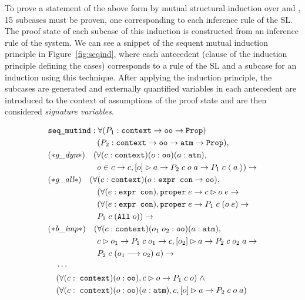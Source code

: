 To prove a statement of the above form by mutual structural induction over  and , 15 subcases must be proven, one corresponding to each inference rule of the SL. The proof state of each subcase of this induction is constructed from an inference rule of the system.
%
We can see a snippet of the sequent mutual induction principle in Figure~\ref{fig:seqind}, where each antecedent (clause of the induction principle defining the cases) corresponds to a rule of the SL and a subcase for an induction using this technique. 
After applying the induction principle, the subcases are generated and
externally quantified variables in each antecedent are introduced to the context of assumptions of the proof state and are then considered \emph{signature variables}.
\begin{figure}%
\begin{align*}
& \sltm{seq\_mutind} : \forall (P_1 : \sltm{context} \rightarrow \sltm{oo} \rightarrow \coqtm{Prop}) \\
& \qquad\qquad\qquad (P_2 : \sltm{context} \rightarrow \sltm{oo} \rightarrow \sltm{atm} \rightarrow \coqtm{Prop}), \\
& (* \rlnmsinit{} *) \quad (\forall (c : \sltm{context}) (o : \sltm{oo}) (a : \sltm{atm}), \\
& \qquad\qquad\qquad o \in c \rightarrow \bchsl[c]{o}{a} \rightarrow P_2 \; c \; o \; a \rightarrow P_1 \; c \; \atom{a}) \rightarrow \\
& (* \rlnmsall{} *) \quad (\forall (c : \sltm{context}) (o : \sltm{expr con} \rightarrow \sltm{oo}), \\
& \qquad\qquad\qquad (\forall (e : \sltm{expr con}), \hybridtm{proper} \; e \rightarrow \seqsl[c]{o \; e} \rightarrow \\
& \qquad\qquad\qquad (\forall (e : \sltm{expr con}), \hybridtm{proper} \; e \rightarrow P_1 \; c \; (o \; e) \rightarrow \\
& \qquad\qquad\qquad P_1 \; c \; (\sltm{All} \; o)) \rightarrow \\
& (* \rlnmbimp{} *) \quad (\forall (c : \sltm{context}) (o_1 \; o_2 : \sltm{oo}) (a : \sltm{atm}), \\
& \qquad\qquad\qquad \seqsl[c]{o_1} \rightarrow P_1 \; c \; o_1 \rightarrow \bchsl[c]{o_2}{a} \rightarrow P_2 \; c \; o_2 \; a \rightarrow \\
& \qquad\qquad\qquad P_2 \; c \; (o_1 \longrightarrow o_2) \; a)   \rightarrow \\
& \quad \cdots\\
& \quad (\forall (c : \; \sltm{context}) (o : \sltm{oo}), \seqsl[c]{o} \rightarrow P_1 \; c \; o) \; \wedge \\
& \quad (\forall (c : \; \sltm{context}) (o : \sltm{oo}) (a : \sltm{atm}), \bchsl[c]{o}{a} \rightarrow P_2 \; c \; o \; a)
\end{align*}
\end{figure}

